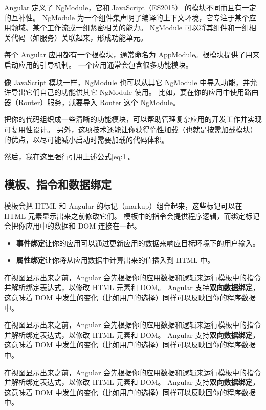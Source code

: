 \documentclass{progbookcn}
\begin{document}
Angular 定义了 NgModule，它和 JavaScript（ES2015） 的模块不同而且有一定的互补性。 NgModule 为一个组件集声明了编译的上下文环境，它专注于某个应用领域、某个工作流或一组紧密相关的能力。 NgModule 可以将其组件和一组相关代码（如服务）关联起来，形成功能单元。


每个 Angular 应用都有一个根模块，通常命名为 AppModule。根模块提供了用来启动应用的引导机制。 一个应用通常会包含很多功能模块。

像 JavaScript 模块一样，NgModule 也可以从其它 NgModule 中导入功能，并允许导出它们自己的功能供其它 NgModule 使用。 比如，要在你的应用中使用路由器（Router）服务，就要导入 Router 这个 NgModule。

把你的代码组织成一些清晰的功能模块，可以帮助管理复杂应用的开发工作并实现可复用性设计。 另外，这项技术还能让你获得惰性加载（也就是按需加载模块）的优点，以尽可能减小启动时需要加载的代码体积。

然后，我在这里强行引用上述公式\ref{eq:1}。

\subsection{模板、指令和数据绑定}

模板会把 HTML 和 Angular 的标记（markup）组合起来，这些标记可以在 HTML 元素显示出来之前修改它们。 模板中的指令会提供程序逻辑，而绑定标记会把你应用中的数据和 DOM 连接在一起。

\begin{itemize}
  \item \textbf{事件绑定}让你的应用可以通过更新应用的数据来响应目标环境下的用户输入。
  \item \textbf{属性绑定}让你将从应用数据中计算出来的值插入到 HTML 中。
\end{itemize}

在视图显示出来之前，Angular 会先根据你的应用数据和逻辑来运行模板中的指令并解析绑定表达式，以修改 HTML 元素和 DOM。 Angular 支持\textbf{双向数据绑定}，这意味着 DOM 中发生的变化（比如用户的选择）同样可以反映回你的程序数据中。

在视图显示出来之前，Angular 会先根据你的应用数据和逻辑来运行模板中的指令并解析绑定表达式，以修改 HTML 元素和 DOM。 Angular 支持\textbf{双向数据绑定}，这意味着 DOM 中发生的变化（比如用户的选择）同样可以反映回你的程序数据中。

在视图显示出来之前，Angular 会先根据你的应用数据和逻辑来运行模板中的指令并解析绑定表达式，以修改 HTML 元素和 DOM。 Angular 支持\textbf{双向数据绑定}，这意味着 DOM 中发生的变化（比如用户的选择）同样可以反映回你的程序数据中。
\end{document}

